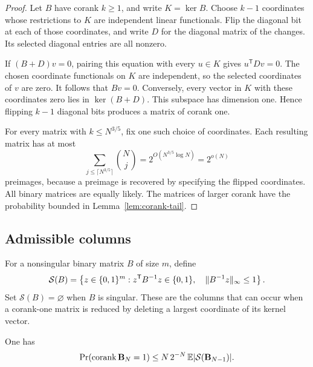 \begin{proof}
Let \(B\) have corank \(k\ge1\), and write \(K=\ker B\). Choose \(k-1\)
coordinates whose restrictions to \(K\) are independent linear
functionals. Flip the diagonal bit at each of those coordinates, and
write \(D\) for the diagonal matrix of the changes. Its selected
diagonal entries are all nonzero.

If \((B+D)v=0\), pairing this equation with every \(u\in K\) gives
\(u^{\mathsf T}Dv=0\). The chosen coordinate functionals on \(K\) are
independent, so the selected coordinates of \(v\) are zero. It follows
that \(Bv=0\). Conversely, every vector in \(K\) with these coordinates
zero lies in \(\ker(B+D)\). This subspace has dimension one. Hence
flipping \(k-1\) diagonal bits produces a matrix of corank one.

For every matrix with \(k\le N^{3/5}\), fix one such choice of
coordinates. Each resulting matrix has at most
\[
 \sum_{j\le \lceil N^{3/5}\rceil}\binom Nj
   =2^{O(N^{3/5}\log N)}=2^{o(N)}
\]
preimages, because a preimage is recovered by specifying the flipped
coordinates. All binary matrices are equally likely. The matrices of
larger corank have the probability bounded in
Lemma~\ref{lem:corank-tail}.
\end{proof}

\subsection{Admissible columns}

For a nonsingular binary matrix \(B\) of size \(m\), define
\begin{equation}\label{eq:admissible-set}
 \mathcal S(B)=
 \left\{z\in\{0,1\}^m:
 z^{\mathsf T}B^{-1}z\in\{0,1\},\quad
 \|B^{-1}z\|_\infty\le1\right\}.
\end{equation}
Set \(\mathcal S(B)=\varnothing\) when \(B\) is singular. These are the
columns that can occur when a corank-one matrix is reduced by deleting
a largest coordinate of its kernel vector.

\begin{lemma}\label{lem:column-reduction}
One has
\[
 \Pr(\operatorname{corank}\mathbf B_N=1)
 \le N\,2^{-N}\,\mathbb E|\mathcal S(\mathbf B_{N-1})|.
\]
\end{lemma}

